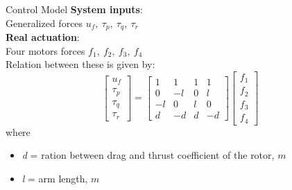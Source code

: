 \begin{frame}{Control Model}
\textbf{System inputs}:\\ Generalized forces $ u_f, \ \tau_p, \ \tau_q, \ \tau_r $\\
\bigskip 
\textbf{Real actuation}:\\
Four motors forces $ f_1, \ f_2, \ f_3, \ f_4 $\\
\bigskip
Relation between these is given by:
\begin{equation}
\begin{bmatrix}
u_f \\ \tau_p \\ \tau_q \\ \tau_r
\end{bmatrix} = 
\begin{bmatrix}
1 & 1 & 1 & 1 \\
0 & -l & 0 & l \\
-l & 0 & l & 0 \\
d & -d & d & -d
\end{bmatrix}
\begin{bmatrix}
f_1 \\ f_2 \\ f_3 \\ f_4
\end{bmatrix}
\label{force_mapping}
\end{equation}
where
\begin{itemize}
\item \textit{d} = ration between drag and thrust coefficient of the rotor, $ m $
\item \textit{l} = arm length, $ m $
\end{itemize}

\end{frame}
